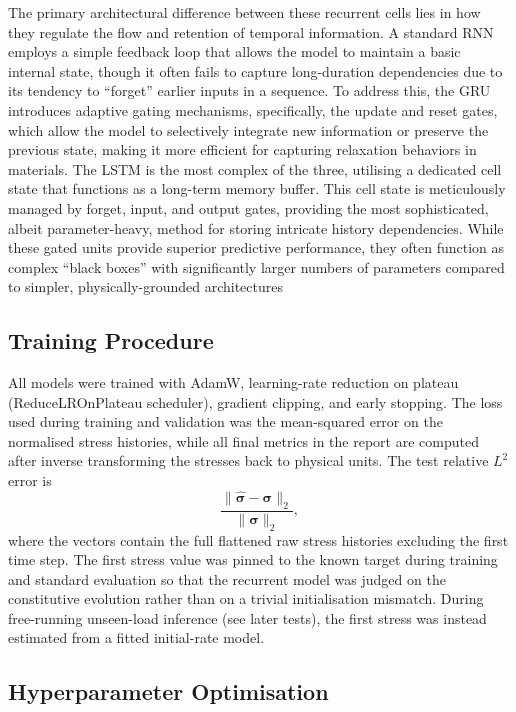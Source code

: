 \documentclass[11pt,a4paper, onecolumn]{article}
\begin{document}
The primary architectural difference between these recurrent cells lies in how they regulate the flow and retention of temporal information. A standard RNN employs a simple feedback loop that allows the model to maintain a basic internal state, though it often fails to capture long-duration dependencies due to its tendency to ``forget'' earlier inputs in a sequence. To address this, the GRU introduces adaptive gating mechanisms, specifically, the update and reset gates, which allow the model to selectively integrate new information or preserve the previous state, making it more efficient for capturing relaxation behaviors in materials. The LSTM is the most complex of the three, utilising a dedicated cell state that functions as a long-term memory buffer. This cell state is meticulously managed by forget, input, and output gates, providing the most sophisticated, albeit parameter-heavy, method for storing intricate history dependencies. While these gated units provide superior predictive performance, they often function as complex ``black boxes'' with significantly larger numbers of parameters compared to simpler, physically-grounded architectures

\subsection{Training Procedure}

All models were trained with AdamW, learning-rate reduction on plateau (ReduceLROnPlateau scheduler), gradient clipping, and early stopping. The loss used during training and validation was the mean-squared error on the normalised stress histories, while all final metrics in the report are computed after inverse transforming the stresses back to physical units. The test relative $L^2$ error is
\begin{equation}
\frac{\lVert \hat{\bm{\sigma}}-\bm{\sigma}\rVert_2}{\lVert \bm{\sigma}\rVert_2},
\label{eq:relative_l2}
\end{equation}
where the vectors contain the full flattened raw stress histories excluding the first time step. The first stress value was pinned to the known target during training and standard evaluation so that the recurrent model was judged on the constitutive evolution rather than on a trivial initialisation mismatch. During free-running unseen-load inference (see later tests), the first stress was instead estimated from a fitted initial-rate model.

\subsection{Hyperparameter Optimisation}
\end{document}

